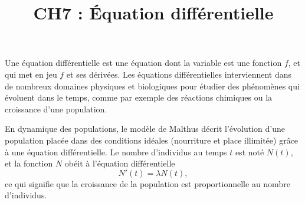 \documentclass[a4paper, 11pt]{article}
\begin{document}
\tableofcontents
\title{CH7 : Équation différentielle} 
\vspace{0.5cm}

\vspace{0.3cm}


\noindent Une \'equation diff\'erentielle est une \'equation dont la variable est une fonction $f$, et qui met en jeu $f$ et ses d\'eriv\'ees. Les \'equations diff\'erentielles interviennent dans de nombreux domaines physiques et biologiques pour \'etudier des ph\'enom\`enes qui \'evoluent dans le temps, comme par exemple des r\'eactions chimiques ou la croissance d'une population.

\begin{exemple}
En dynamique des populations, le mod\`ele de Malthus d\'ecrit l'\'evolution d'une population plac\'ee dans des conditions id\'eales (nourriture et place illimit\'ee) gr\^ace \`a une \'equation diff\'erentielle. Le nombre d'individus au temps $t$ est not\'e $N(t)$, et la fonction $N$ ob\'eit \`a l'\'equation diff\'erentielle
$$N'(t) = \lambda N(t),$$
ce qui signifie que la croissance de la population est proportionnelle au nombre d'individus.
\end{exemple}
\end{document}
